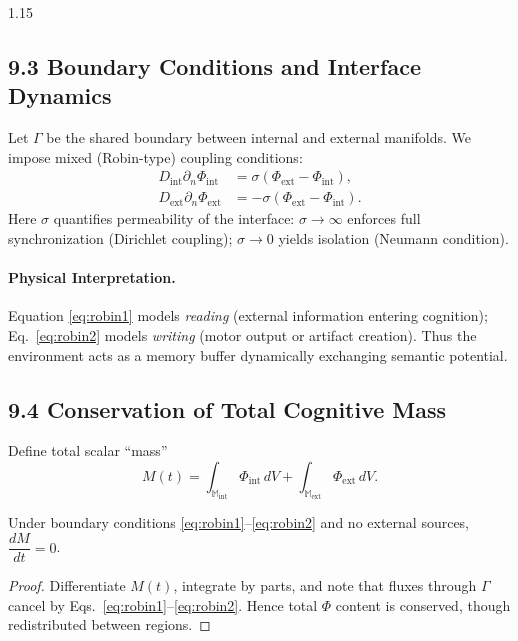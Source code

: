 \documentclass[12pt,a4paper]{article}
\begin{document}
\begin{spacing}{1.15}
\subsection{9.3 Boundary Conditions and Interface Dynamics}

Let $\Gamma$ be the shared boundary between internal and external manifolds.  
We impose mixed (Robin-type) coupling conditions:
\begin{align}
D_{\mathrm{int}}\partial_n \Phi_{\mathrm{int}} 
  &= \sigma(\Phi_{\mathrm{ext}}-\Phi_{\mathrm{int}}), \label{eq:robin1}\\
D_{\mathrm{ext}}\partial_n \Phi_{\mathrm{ext}} 
  &= -\sigma(\Phi_{\mathrm{ext}}-\Phi_{\mathrm{int}}). \label{eq:robin2}
\end{align}
Here $\sigma$ quantifies permeability of the interface:  
$\sigma\!\to\!\infty$ enforces full synchronization (Dirichlet coupling); $\sigma\!\to\!0$ yields isolation (Neumann condition).

\paragraph{Physical Interpretation.}  
Equation \eqref{eq:robin1} models \emph{reading} (external information entering cognition);  
Eq.~\eqref{eq:robin2} models \emph{writing} (motor output or artifact creation).  
Thus the environment acts as a memory buffer dynamically exchanging semantic potential.

\subsection{9.4 Conservation of Total Cognitive Mass}

Define total scalar “mass”
\[
M(t)=\int_{\mathbb{M}_{\mathrm{int}}}\!\Phi_{\mathrm{int}}\,dV
      +\int_{\mathbb{M}_{\mathrm{ext}}}\!\Phi_{\mathrm{ext}}\,dV.
\]

\begin{theorem}
Under boundary conditions \eqref{eq:robin1}–\eqref{eq:robin2} and no external sources,
$\dfrac{dM}{dt}=0$.
\end{theorem}

\begin{proof}
Differentiate $M(t)$, integrate by parts, and note that fluxes through $\Gamma$ cancel by Eqs.~\eqref{eq:robin1}–\eqref{eq:robin2}.  
Hence total $\Phi$ content is conserved, though redistributed between regions.
\end{proof}


\end{spacing}
\end{document}
